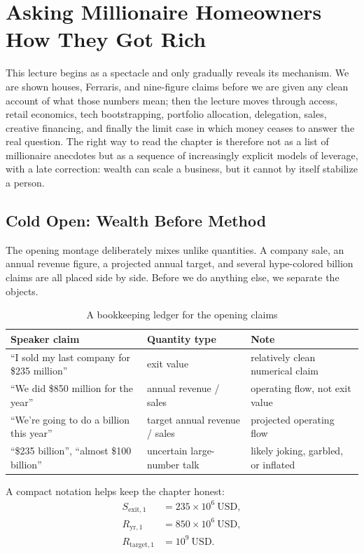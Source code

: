 \chapter{Asking Millionaire Homeowners How They Got Rich}

This lecture begins as a spectacle and only gradually reveals its mechanism. We are shown houses, Ferraris, and nine-figure claims before we are given any clean account of what those numbers mean; then the lecture moves through access, retail economics, tech bootstrapping, portfolio allocation, delegation, sales, creative financing, and finally the limit case in which money ceases to answer the real question. The right way to read the chapter is therefore not as a list of millionaire anecdotes but as a sequence of increasingly explicit models of leverage, with a late correction: wealth can scale a business, but it cannot by itself stabilize a person.

\section{Cold Open: Wealth Before Method}

The opening montage deliberately mixes unlike quantities. A company sale, an annual revenue figure, a projected annual target, and several hype-colored billion claims are all placed side by side. Before we do anything else, we separate the objects.

\begin{table}[h]
\centering
\caption{A bookkeeping ledger for the opening claims}
\begin{tabular}{|l|l|l|}
\hline
Speaker claim & Quantity type & Note \\
\hline
``I sold my last company for \$235 million'' & exit value & relatively clean numerical claim \\
``We did \$850 million for the year'' & annual revenue / sales & operating flow, not exit value \\
``We're going to do a billion this year'' & target annual revenue / sales & projected operating flow \\
``\$235 billion'', ``almost \$100 billion'' & uncertain large-number talk & likely joking, garbled, or inflated \\
\hline
\end{tabular}
\end{table}

A compact notation helps keep the chapter honest:
\begin{align}
S_{\mathrm{exit},1} &= 235\times 10^{6}\ \mathrm{USD},\\
R_{\mathrm{yr},1} &= 850\times 10^{6}\ \mathrm{USD},\\
R_{\mathrm{target},1} &= 10^{9}\ \mathrm{USD}.
\end{align}

